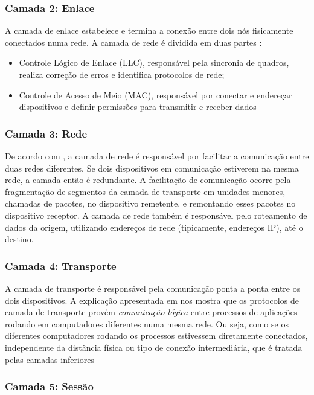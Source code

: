 \documentclass[tcc,capa]{texufpel}
\begin{document}
\subsubsection{Camada 2: Enlace}

A camada de enlace estabelece e termina a conexão entre dois nós fisicamente conectados numa rede. A camada de rede é dividida em duas partes \cite{imperva}: 
    \begin{itemize}
        \item Controle Lógico de Enlace (LLC), responsável pela sincronia de quadros, realiza correção de erros e identifica protocolos de rede;
        \item Controle de Acesso de Meio (MAC), responsável por conectar e endereçar dispositivos e definir permissões para transmitir e receber dados
    \end{itemize}

\subsubsection{Camada 3: Rede}

De acordo com \citet{cloudflare_layers}, a camada de rede é responsável por facilitar a comunicação entre duas redes diferentes. Se dois dispositivos em comunicação estiverem na mesma rede, a camada então é redundante. A facilitação de comunicação ocorre \citet{cloudflare_layers} pela fragmentação de segmentos da camada de transporte em unidades menores, chamadas de pacotes, no dispositivo remetente, e remontando esses pacotes no dispositivo receptor. A camada de rede também é responsável pelo roteamento de dados da origem, utilizando endereços de rede (tipicamente, endereços IP), até o destino.

\subsubsection{Camada 4: Transporte}

A camada de transporte é responsável pela comunicação ponta a ponta entre os dois dispositivos. A explicação apresentada em \citet{kurose} nos mostra que os protocolos de camada de transporte provém \textit{comunicação lógica} entre processos de aplicações rodando em computadores diferentes numa mesma rede. Ou seja, como se os diferentes computadores rodando os processos estivessem diretamente conectados, independente da distância física ou tipo de conexão intermediária, que é tratada pelas camadas inferiores

\subsubsection{Camada 5: Sessão}
\end{document}
